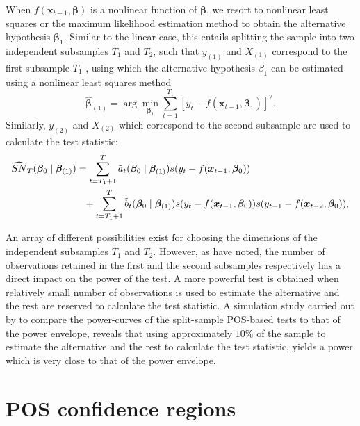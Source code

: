 \documentclass[harvard,11pt]{article}
\begin{document}
When $f(\bm{x}_{t-1},\bm{\beta})$ is a nonlinear function of $\bm{\beta}$, we resort to nonlinear least squares or the maximum likelihood estimation method to obtain the alternative hypothesis $\bm{\beta}_1$. Similar to the linear case, this entails splitting the sample into two independent subsamples $T_1$ and $T_2$, such that $y_{(1)}$ and $X_{(1)}$ correspond to the first subsample $T_1$ , using which the alternative hypothesis $\beta_1$ can be estimated using a nonlinear least squares method
\begin{equation*}   
\hat{\bm{\beta}}_{(1)}=\arg\min_{\bm{\beta}_1}\sum\limits_{t=1}^{T_1}\left[y_t-f(\bm{x}_{t-1},\bm{\beta}_1)\right]^2.
\end{equation*}
Similarly, $y_{(2)}$ and $X_{(2)}$ which correspond to the second subsample are used to calculate the test statistic:
\begin{align*}
\widehat{SN}_{T}(\bm{\beta} _{0}\mid\bm{\beta}_{(1)})&=\sum\limits_{t=T_1+1}^{T}\tilde{a}%
_{t}(\bm{\beta}_{0}\mid\bm{\beta}_{(1)})s(y_{t}-f(\bm{x}_{t-1},\bm{\beta}
_{0}))\\
&\textcolor{white}{=}+\sum\limits_{t=T_1+1}^{T}\tilde{b}_{t}(\bm{\beta}_{0}\mid\bm{\beta}_{(1)})%
s(y_{t}-f(\bm{x}_{t-1},\bm{\beta}_{0}))s(y_{t-1}-f(\bm{x}_{t-2},\bm{\beta}_{0})),
\end{align*}%

An array of different possibilities exist for choosing the dimensions of the independent subsamples $T_{1}$ and $T_{2}$. However, as
\citet{dufour2010exact} have noted, the number of observations retained
in the first and the second subsamples respectively has a direct impact on the power of
the test. A more powerful test is obtained
when relatively small number of observations is used to estimate the
alternative and the rest are reserved to calculate
the test statistic. A simulation
study carried out by \citet{dufour2010exact} to compare the power-curves of the split-sample POS-based tests to that of the
power envelope, reveals that using approximately $10\%$ of the sample to
estimate the alternative and the rest to calculate the test statistic, yields a power which is very close to that of the power
envelope. 

\section{POS confidence regions \label{POS confidence regions}}
\end{document}
